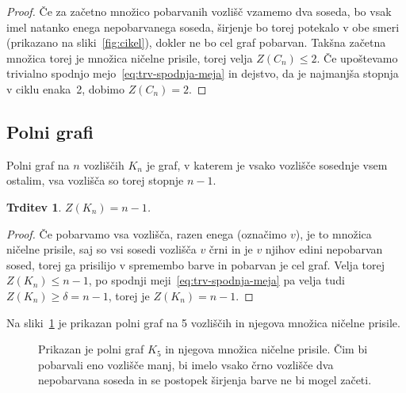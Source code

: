 \documentclass[12pt,a4paper,twoside]{article}
\theoremstyle{definition} %
\theoremstyle{plain} %
\newtheorem{trditev}[definicija]{Trditev}
\numberwithin{equation}{section}  %
\begin{document}
\begin{proof}
    Če za začetno množico pobarvanih vozlišč vzamemo dva soseda, bo vsak imel natanko enega nepobarvanega soseda, širjenje bo torej potekalo v obe smeri (prikazano na sliki~\ref{fig:cikel}), dokler ne bo cel graf pobarvan. Takšna začetna množica torej je množica ničelne prisile, torej velja $Z(C_n) \leq 2$. Če upoštevamo trivialno spodnjo mejo~\ref{eq:trv-spodnja-meja} in dejstvo, da je najmanjša stopnja v ciklu enaka~2, dobimo $Z(C_n) = 2$.\qedhere
\end{proof}

\subsection{Polni grafi}
Polni graf na $n$ vozliščih $K_n$ je graf, v katerem je vsako vozlišče sosednje vsem ostalim, vsa vozlišča so torej stopnje $n-1$. 
\begin{trditev}
    \label{trd:polni-graf}
    $Z(K_n) = n-1$.
\end{trditev}
\begin{proof}
    Če pobarvamo vsa vozlišča, razen enega (označimo $v$), je to množica ničelne prisile, saj so vsi sosedi vozlišča $v$ črni in je $v$ njihov edini nepobarvan sosed, torej ga prisilijo v spremembo barve in pobarvan je cel graf. Velja torej $Z(K_n) \leq n-1$, po spodnji meji~\ref{eq:trv-spodnja-meja} pa velja tudi $Z(K_n) \geq \delta = n-1$, torej je $Z(K_n) = n-1$.
\end{proof}
Na sliki~\ref{fig:polni-graf} je prikazan polni graf na 5 vozliščih in njegova množica ničelne prisile.
\begin{figure}[h]
    \centering
    \caption{Prikazan je polni graf $K_5$ in njegova množica ničelne prisile. Čim bi pobarvali eno vozlišče manj, bi imelo vsako črno vozlišče dva nepobarvana soseda in se postopek širjenja barve ne bi mogel začeti.}
    \label{fig:polni-graf}
\end{figure}
\end{document}
